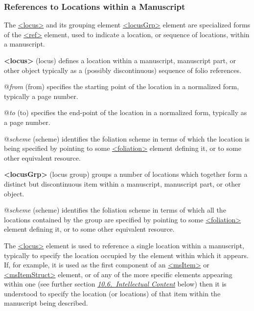 \subsubsection[{References to Locations within a Manuscript}]{References to Locations within a Manuscript}\label{msloc}\par
The \hyperref[TEI.locus]{<locus>} and its grouping element \hyperref[TEI.locusGrp]{<locusGrp>} element are specialized forms of the \hyperref[TEI.ref]{<ref>} element, used to indicate a location, or sequence of locations, within a manuscript. 
\begin{sansreflist}
  
\item [\textbf{<locus>}] (locus) defines a location within a manuscript, manuscript part, or other object typically as a (possibly discontinuous) sequence of folio references.\hfil\\[-10pt]\begin{sansreflist}
    \item[@{\itshape from}]
  (from) specifies the starting point of the location in a normalized form, typically a page number.
    \item[@{\itshape to}]
  (to) specifies the end-point of the location in a normalized form, typically as a page number.
    \item[@{\itshape scheme}]
  (scheme) identifies the foliation scheme in terms of which the location is being specified by pointing to some \hyperref[TEI.foliation]{<foliation>} element defining it, or to some other equivalent resource.
\end{sansreflist}  
\item [\textbf{<locusGrp>}] (locus group) groups a number of locations which together form a distinct but discontinuous item within a manuscript, manuscript part, or other object.\hfil\\[-10pt]\begin{sansreflist}
    \item[@{\itshape scheme}]
  (scheme) identifies the foliation scheme in terms of which all the locations contained by the group are specified by pointing to some \hyperref[TEI.foliation]{<foliation>} element defining it, or to some other equivalent resource.
\end{sansreflist}  
\end{sansreflist}
\par
The \hyperref[TEI.locus]{<locus>} element is used to reference a single location within a manuscript, typically to specify the location occupied by the element within which it appears. If, for example, it is used as the first component of an \hyperref[TEI.msItem]{<msItem>} or \hyperref[TEI.msItemStruct]{<msItemStruct>} element, or of any of the more specific elements appearing within one (see further section \textit{\hyperref[msco]{10.6.\ Intellectual Content}} below) then it is understood to specify the location (or locations) of that item within the manuscript being described.
